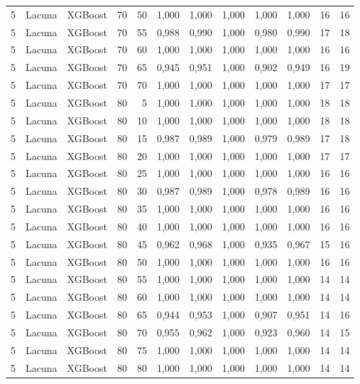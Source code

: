 \begin{longtable}{@{}rllrrrrrrrrr@{}}
5 & Lacuna & XGBoost & 70 & 50 & 1,000 & 1,000 & 1,000 & 1,000 & 1,000 & 16 & 16 \\
5 & Lacuna & XGBoost & 70 & 55 & 0,988 & 0,990 & 1,000 & 0,980 & 0,990 & 17 & 18 \\
5 & Lacuna & XGBoost & 70 & 60 & 1,000 & 1,000 & 1,000 & 1,000 & 1,000 & 16 & 16 \\
5 & Lacuna & XGBoost & 70 & 65 & 0,945 & 0,951 & 1,000 & 0,902 & 0,949 & 16 & 19 \\
5 & Lacuna & XGBoost & 70 & 70 & 1,000 & 1,000 & 1,000 & 1,000 & 1,000 & 17 & 17 \\
5 & Lacuna & XGBoost & 80 & 5 & 1,000 & 1,000 & 1,000 & 1,000 & 1,000 & 18 & 18 \\
5 & Lacuna & XGBoost & 80 & 10 & 1,000 & 1,000 & 1,000 & 1,000 & 1,000 & 18 & 18 \\
5 & Lacuna & XGBoost & 80 & 15 & 0,987 & 0,989 & 1,000 & 0,979 & 0,989 & 17 & 18 \\
5 & Lacuna & XGBoost & 80 & 20 & 1,000 & 1,000 & 1,000 & 1,000 & 1,000 & 17 & 17 \\
5 & Lacuna & XGBoost & 80 & 25 & 1,000 & 1,000 & 1,000 & 1,000 & 1,000 & 16 & 16 \\
5 & Lacuna & XGBoost & 80 & 30 & 0,987 & 0,989 & 1,000 & 0,978 & 0,989 & 16 & 16 \\
5 & Lacuna & XGBoost & 80 & 35 & 1,000 & 1,000 & 1,000 & 1,000 & 1,000 & 16 & 16 \\
5 & Lacuna & XGBoost & 80 & 40 & 1,000 & 1,000 & 1,000 & 1,000 & 1,000 & 16 & 16 \\
5 & Lacuna & XGBoost & 80 & 45 & 0,962 & 0,968 & 1,000 & 0,935 & 0,967 & 15 & 16 \\
5 & Lacuna & XGBoost & 80 & 50 & 1,000 & 1,000 & 1,000 & 1,000 & 1,000 & 16 & 16 \\
5 & Lacuna & XGBoost & 80 & 55 & 1,000 & 1,000 & 1,000 & 1,000 & 1,000 & 14 & 14 \\
5 & Lacuna & XGBoost & 80 & 60 & 1,000 & 1,000 & 1,000 & 1,000 & 1,000 & 14 & 14 \\
5 & Lacuna & XGBoost & 80 & 65 & 0,944 & 0,953 & 1,000 & 0,907 & 0,951 & 14 & 16 \\
5 & Lacuna & XGBoost & 80 & 70 & 0,955 & 0,962 & 1,000 & 0,923 & 0,960 & 14 & 15 \\
5 & Lacuna & XGBoost & 80 & 75 & 1,000 & 1,000 & 1,000 & 1,000 & 1,000 & 14 & 14 \\
5 & Lacuna & XGBoost & 80 & 80 & 1,000 & 1,000 & 1,000 & 1,000 & 1,000 & 14 & 14 \\

\end{longtable}
